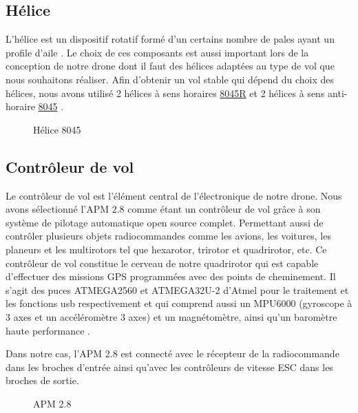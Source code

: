 \subsection{Hélice}
L'hélice est un dispositif rotatif formé d’un certains nombre de pales ayant un profile d'aile \cite{aerohesbaye}. Le choix de ces composants est aussi important lors de la conception de notre drone dont il faut des hélices adaptées au type de vol que nous souhaitons réaliser. Afin d'obtenir un vol stable qui dépend du choix des hélices, nous avons utilisé 2 hélices à sens horaires \underline{8045R} et 2 hélices à sens anti-horaire \underline{8045} \cite{FPV24}.
\begin{figure} [H]
	\begin{center}
		\centering
	\end{center}
	\caption{Hélice 8045}
\end{figure}
\subsection {Contrôleur de vol }
Le contrôleur de vol est l'élément central de l'électronique de notre drone.
Nous avons sélectionné l'APM 2.8 comme étant un contrôleur de vol grâce à son système de pilotage automatique open source complet. Permettant aussi de contrôler plusieurs objets radiocommandes comme les avions, les voitures, les planeurs et les multirotors tel que hexarotor, trirotor et quadrirotor, etc.
Ce contrôleur de vol constitue le cerveau de notre quadrirotor qui est capable d'effectuer des missions GPS programmées avec des points de cheminement. Il s'agit des puces ATMEGA2560 et ATMEGA32U-2 d'Atmel pour le traitement et les fonctions usb respectivement et qui comprend aussi un MPU6000 (gyroscope à 3 axes et un accéléromètre 3 axes)  et un magnétomètre, ainsi qu'un baromètre haute performance \cite{abraelectronics}.

Dans notre cas, l'APM 2.8 est connecté avec le récepteur de la radiocommande dans les broches d’entrée ainsi qu'avec les contrôleurs de vitesse ESC dans les broches de sortie. 

\begin{figure} [H]
	\begin{center}
		\centering
	\end{center}
	\caption{APM 2.8}
\end{figure}

